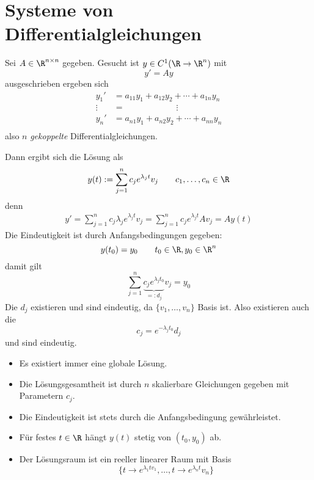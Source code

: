%

\section{Systeme von Differentialgleichungen} %


Sei $A \in \R^{n\times n}$ gegeben.
Gesucht ist $y \in C^1(\R \to \R^n)$ mit
\[
	y' = Ay
\]
ausgeschrieben ergeben sich
\begin{align*}
	y_1' &= a_{11} y_1 + a_{12} y_2 + \dotsb + a_{1n} y_n \\
	\vdots \; &= \qquad\qquad\qquad \vdots \\
	y_n' &= a_{n1} y_1 + a_{n2} y_2 + \dotsb + a_{nn} y_n \\
\end{align*}
also $n$ \emph{gekoppelte} Differentialgleichungen.

\begin{seg}[Fall 1: ${v_1,\dotsc, v_n}$ bildet eine Basis aus Eigenvektoren: $Av_j = \lambda_j v_j$]
	Dann ergibt sich die Lösung als
	\[
		y(t) := \sum_{j=1}^n c_j e^{\lambda_j t} v_j
		\qquad c_1,\dotsc, c_n \in \R
	\]
	denn
	\begin{align*}
		y' = \sum_{j=1}^n c_j \lambda_j e^{\lambda_j t} v_j = \sum_{j=1}^n c_j e^{\lambda_j t} Av_j = A y(t)
	\end{align*}
	Die Eindeutigkeit ist durch Anfangsbedingungen gegeben:
	\[
		y(t_0) = y_0
		\qquad t_0 \in \R, y_0 \in \R^n
	\]
	damit gilt	
	\[
		\sum_{j=1}^n \underbrace{c_j e^{\lambda_j t_0}}_{=:d_j} v_j = y_0
	\]
	Die $d_j$ existieren und sind eindeutig, da $\{v_1,\dotsc,v_n\}$ Basis ist.
	Also existieren auch die
	\[
		c_j  = e^{-\lambda_j t_0} d_j
	\]
	und sind eindeutig.

	\begin{note}[Beobachtungen]
		\begin{itemize}
			\item
				Es existiert immer eine globale Lösung.
			\item
				Die Lösungsgesamtheit ist durch $n$ skalierbare Gleichungen gegeben mit Parametern $c_j$.
			\item
				Die Eindeutigkeit ist stets durch die Anfangsbedingung gewährleistet.
			\item
				Für festes $t \in \R$ hängt $y(t)$ stetig von $(t_0, y_0)$ ab.
			\item
				Der Lösungsraum ist ein reeller linearer Raum mit Basis
				\[
					\{ t \to e^{\lambda_1 t v_1}, \dotsc, t\to e^{\lambda_n t}v_n\}
				\]
		\end{itemize}
	\end{note}
\end{seg}

